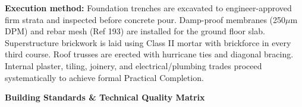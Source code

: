 \noindent
\begin{minipage}[t]{0.185\textwidth}\end{minipage}\hfill
\begin{minipage}[t]{0.185\textwidth}\end{minipage}\hfill
\begin{minipage}[t]{0.185\textwidth}\end{minipage}\hfill
\begin{minipage}[t]{0.185\textwidth}\end{minipage}\hfill
\begin{minipage}[t]{0.185\textwidth}\end{minipage}

\vspace{0.20cm}

\noindent
\begin{tcolorbox}[enhanced, colback=mhoffwhite, colframe=mhlightgray, boxrule=0.7pt, arc=4pt, left=9pt, right=9pt, top=7pt, bottom=7pt, borderline west={3pt}{0pt}{mhgold}, drop shadow=black!4]
    {\fontsize{8.1pt}{11.0pt}\selectfont\color{mhtext}
    \textbf{Execution method:} Foundation trenches are excavated to engineer-approved firm strata and inspected before concrete pour. Damp-proof membranes (250$\mu$m DPM) and rebar mesh (Ref 193) are installed for the ground floor slab. Superstructure brickwork is laid using Class II mortar with brickforce in every third course. Roof trusses are erected with hurricane ties and diagonal bracing. Internal plaster, tiling, joinery, and electrical/plumbing trades proceed systematically to achieve formal Practical Completion.
    }
\end{tcolorbox}

\vfill

\noindent
{\large\bfseries\color{mhnavy} Building Standards \& Technical Quality Matrix}
\vspace{0.10cm}

